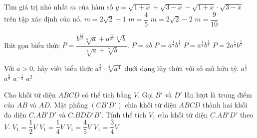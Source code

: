 \begin{ex}%
	Tìm giá trị nhỏ nhất $m$ của hàm số $y=\sqrt{1+x}+\sqrt{3-x}-\sqrt{1+x}\cdot \sqrt{3-x}$ trên tập xác định của nó.
	\choice
	{$m=2\sqrt{2}-1$}
	{$m=\dfrac{4}{5}$}
	{\True $m=2\sqrt{2}-2$}
	{$m=\dfrac{9}{10}$}
\end{ex}

\begin{ex}%
	Rút gọn biểu thức $P=\dfrac{b^{\tfrac{12}{35}}\sqrt[5]{a}+a^{\tfrac{12}{35}}\sqrt[5]{b}}{\sqrt[7]{a}+\sqrt[7]{b}}$.
	\choice
	{$P=ab$}
	{\True $P=a^{\tfrac{1}{5}}b^{\tfrac{1}{5}}$}
	{$P=a^{\tfrac{1}{7}}b^{\tfrac{1}{7}}$}
	{$P=2a^{\tfrac{1}{5}}b^{\tfrac{1}{5}}$}
\end{ex}

\begin{ex}%
	Với $a>0$, hãy viết biểu thức $a^{\tfrac{2}{3}}\cdot \sqrt[3]{a^4}$ dưới dạng lũy thừa với số mũ hữu tỷ.
	\choice
	{$a^{\tfrac{1}{2}}$}
	{$a^{\tfrac{8}{9}}$}
	{$a^{-\tfrac{1}{2}}$}
	{\True $a^2$}
\end{ex}

\begin{ex}%
	Cho khối tứ diện $ABCD$ có thể tích bằng $V$. Gọi $B'$ và $D'$ lần lượt là trung điểm của $AB$ và $AD$. Mặt phẳng $(CB'D')$ chia khối tứ diện $ABCD$ thành hai khối đa diện $C.AB'D'$ và $C.BDD'B'$. Tính thể tích $V_1$ của khối tứ diện $C.AB'D'$ theo $V$.
	\choice
	{$V_1=\dfrac{1}{2}V$}
	{\True $V_1=\dfrac{1}{4}V$}
	{$V_1=\dfrac{4}{5}V$}
	{$V_1=\dfrac{3}{4}V$}
\end{ex}

